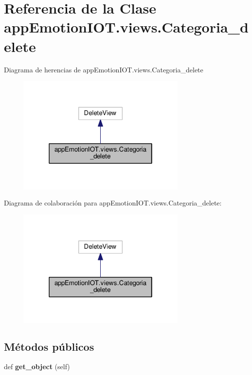 \hypertarget{classappEmotionIOT_1_1views_1_1Categoria__delete}{}\section{Referencia de la Clase app\+Emotion\+I\+O\+T.\+views.\+Categoria\+\_\+delete}
\label{classappEmotionIOT_1_1views_1_1Categoria__delete}


Diagrama de herencias de app\+Emotion\+I\+O\+T.\+views.\+Categoria\+\_\+delete
\nopagebreak
\begin{figure}[H]
\begin{center}
\leavevmode
\includegraphics[width=238pt]{classappEmotionIOT_1_1views_1_1Categoria__delete__inherit__graph}
\end{center}
\end{figure}


Diagrama de colaboración para app\+Emotion\+I\+O\+T.\+views.\+Categoria\+\_\+delete\+:
\nopagebreak
\begin{figure}[H]
\begin{center}
\leavevmode
\includegraphics[width=238pt]{classappEmotionIOT_1_1views_1_1Categoria__delete__coll__graph}
\end{center}
\end{figure}
\subsection*{Métodos públicos}
\begin{DoxyCompactItemize}
\item 
def {\bfseries get\+\_\+object} (self)\hypertarget{classappEmotionIOT_1_1views_1_1Categoria__delete_a436d05c4a3e02aa148abc9cb3f2c1efe}{}\label{classappEmotionIOT_1_1views_1_1Categoria__delete_a436d05c4a3e02aa148abc9cb3f2c1efe}

\end{DoxyCompactItemize}
